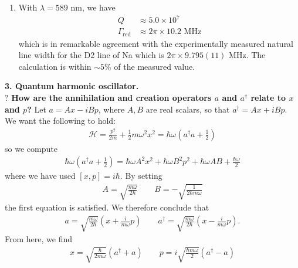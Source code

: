 \documentclass{article}
\theoremstyle{definition}
\newcommand{\ham}{\mathcal{H}}
\newcommand{\f}[2]{\frac{#1}{#2}}
\newcommand{\lp}{\left(}
\newcommand{\rp}{\right)}
\begin{document}
\begin{enumerate}[label=\alph*)]
	\item With $\lambda = 589 $ nm, we have
	\begin{align*}
	Q &\approx 5.0 \times 10^7 \\
	\Gamma_\text{red} &\approx 2\pi \times 10.2 \text{ MHz}
	\end{align*}
	which is in remarkable agreement with the experimentally measured natural line width for the D2 line of Na which is $2\pi \times 9.795(11)$ MHz. The calculation is within $\sim 5$\% of the measured value.  
\end{enumerate}






\noindent \textbf{3. Quantum harmonic oscillator.} \\


\noindent $\boxed{\textbf{?}}$ \textbf{How are the annihilation and creation operators $ a$ and $ a^\dagger$ relate to $ x$ and $ p$?} Let $a = A  x - i B  p$, where $A,B$ are real scalars, so that $ a^\dagger = A x+ i B  p$. We want the following to hold:
\begin{align*}
\ham = \f{p^2 }{2m} + \f{1}{2}m\omega^2 x^2 = \hbar \omega \lp a^\dagger a + \f{1}{2} \rp
\end{align*}
so we compute
\begin{align*}
\hbar \omega \lp a^\dagger a+ \f{1}{2}\rp = \hbar \omega A^2 x^2 + \hbar \omega B^2 p^2 + \hbar \omega AB + \f{\hbar \omega}{2}
\end{align*}
where we have used $[x,p] = i\hbar $. By setting 
\begin{align*}
A = \sqrt{\f{m\omega}{2\hbar}} \quad\quad B = -\sqrt{\f{1}{2\hbar m\omega}}
\end{align*}
the first equation is satisfied. We therefore conclude that
\begin{align*}
a = \sqrt{\f{m\omega}{2\hbar}} \lp x + \f{i}{m\omega} p \rp \quad\quad a^\dagger = \sqrt{\f{m\omega}{2\hbar}} \lp x - \f{i}{m\omega} p \rp.
\end{align*}
From here, we find 
\begin{align*}
x = \sqrt{\f{\hbar}{2 m\omega}}(a^\dagger + a) \quad\quad p = i\sqrt{\f{\hbar m\omega }{2}}(a^\dagger - a)
\end{align*}
\end{document}
